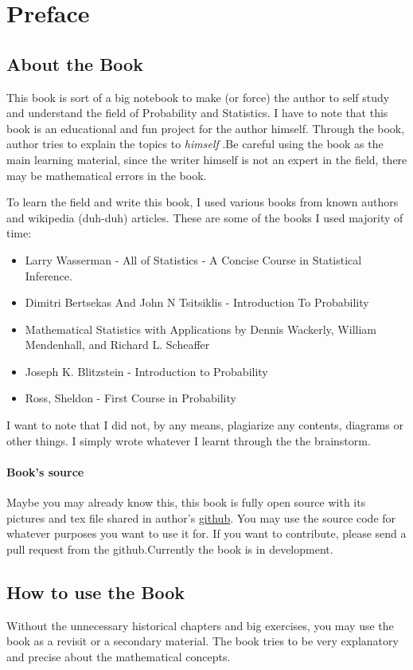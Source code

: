 \chapter*{Preface}

\section*{About the Book}
This book is sort of a big notebook to make (or force) the author to self study and understand the field of Probability and Statistics.
I have to note that this book is an educational and fun project for the author himself. Through the book, author tries to explain the topics to \textit{himself} .Be careful using the book as the main learning material, since the writer himself is not an expert in the field, there may be mathematical errors in the book.

\par
To learn the field and write this book, I used various books from known authors and wikipedia (duh-duh) articles. These are some of the books I used majority of time:

\begin{itemize}
    \item Larry Wasserman - All of Statistics - A Concise Course in Statistical Inference.
    \item Dimitri Bertsekas And John N Tsitsiklis - Introduction To Probability
    \item Mathematical Statistics with Applications by Dennis Wackerly, William Mendenhall, and Richard L. Scheaffer
    \item Joseph K. Blitzstein - Introduction to Probability
    \item Ross, Sheldon - First Course in Probability
  \end{itemize}
I want to note that I did not, by any means, plagiarize any contents, diagrams or other things. I simply wrote whatever I learnt through the the brainstorm.
  

\subsubsection*{Book's source}
Maybe you may already know this, this book is fully open source with its pictures and tex file shared in author's \href{https://github.com/JosephMehdiyev}{github}. You may use the source code for whatever purposes you want to use it for. If you want to contribute, please send a pull request from the github.Currently the book is in development.

\section*{How to use the Book}
Without the unnecessary historical chapters and big exercises, you may use the book as a revisit or a secondary material. The book tries to be very explanatory and precise about the mathematical concepts.
